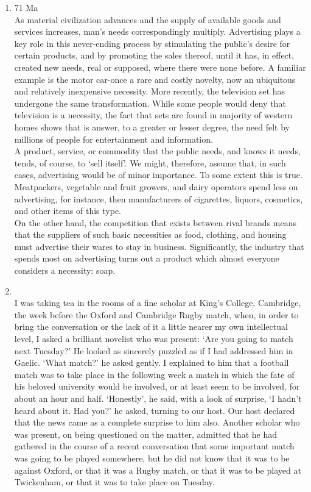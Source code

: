 \documentclass[12pt]{article}
\begin{document}
\begin{enumerate}
    \item 71 Ma\\
      As material civilization advances and the supply of available goods and services increases, man’s needs correspondingly multiply. Advertising plays a key role in this never-ending process by stimulating the public’s desire for certain products, and by promoting the sales thereof, until it has, in effect, created new needs, real or supposed, where there were none before. A familiar example is the motor car-once a rare and costly novelty, now an ubiquitous and relatively inexpensive necessity. More recently, the television set has undergone the same transformation. While some people would deny that television is a necessity, the fact that sets are found in majority of western homes shows that is answer, to a greater or lesser degree, the need felt by millions of people for entertainment and information.\\

      A product, service, or commodity that the public needs, and knows it needs, tends, of course, to ‘sell itself’. We might, therefore, assume that, in such cases, advertising would be of minor importance. To some extent this is true. Meatpackers, vegetable and fruit growers, and dairy operators spend less on advertising, for instance, then manufacturers of cigarettes, liquors, cosmetics, and other items of this type.\\

      On the other hand, the competition that exists between rival brands means that the suppliers of such basic necessities as food, clothing, and housing must advertise their wares to stay in business. Significantly, the industry that spends most on advertising turns out a product which almost everyone considers a necessity: soap.

    \item {}\\
      I was taking tea in the rooms of a fine scholar at King’s College, Cambridge, the week before the Oxford and Cambridge Rugby match, when, in order to bring the conversation or the lack of it a little nearer my own intellectual level, I asked a brilliant novelist who was present: ‘Are you going to match next Tuesday?’ He looked as sincerely puzzled as if I had addressed him in Gaelic. ‘What match?’ he asked gently. I explained to him that a football match was to take place in the following week a match in which the fate of his beloved university would be involved, or at least seem to be involved, for about an hour and half. ‘Honestly’, he said, with a look of surprise, ‘I hadn’t heard about it. Had you?’ he asked, turning to our host. Our host declared that the news came as a complete surprise to him also. Another scholar who was present, on being questioned on the matter, admitted that he had gathered in the course of a recent conversation that some important match was going to be played somewhere, but he did not know that it was to be against Oxford, or that it was a Rugby match, or that it was to be played at Twickenham, or that it was to take place on Tuesday.\\


\end{enumerate}
\end{document}
